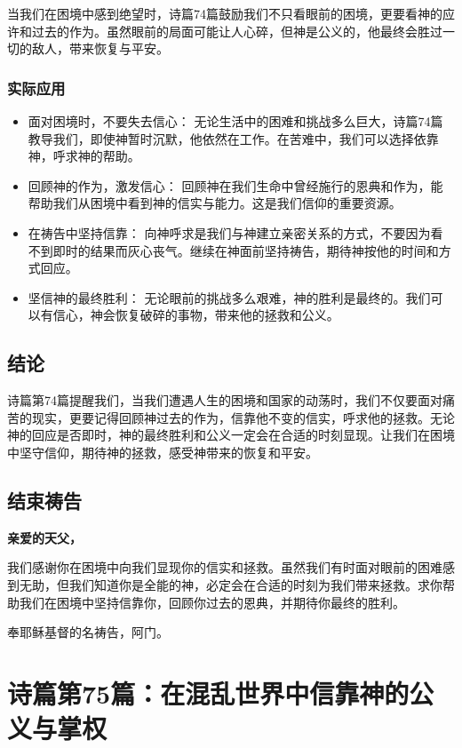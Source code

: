 \documentclass[a4paper, 12pt]{article}
\begin{document}
当我们在困境中感到绝望时，诗篇74篇鼓励我们不只看眼前的困境，更要看神的应许和过去的作为。虽然眼前的局面可能让人心碎，但神是公义的，他最终会胜过一切的敌人，带来恢复与平安。

\subsubsection*{实际应用}
\begin{itemize}
    \item 面对困境时，不要失去信心： 无论生活中的困难和挑战多么巨大，诗篇74篇教导我们，即使神暂时沉默，他依然在工作。在苦难中，我们可以选择依靠神，呼求神的帮助。

    \item 回顾神的作为，激发信心： 回顾神在我们生命中曾经施行的恩典和作为，能帮助我们从困境中看到神的信实与能力。这是我们信仰的重要资源。

    \item 在祷告中坚持信靠： 向神呼求是我们与神建立亲密关系的方式，不要因为看不到即时的结果而灰心丧气。继续在神面前坚持祷告，期待神按他的时间和方式回应。

    \item 坚信神的最终胜利： 无论眼前的挑战多么艰难，神的胜利是最终的。我们可以有信心，神会恢复破碎的事物，带来他的拯救和公义。

\end{itemize}

\subsection*{结论}
诗篇第74篇提醒我们，当我们遭遇人生的困境和国家的动荡时，我们不仅要面对痛苦的现实，更要记得回顾神过去的作为，信靠他不变的信实，呼求他的拯救。无论神的回应是否即时，神的最终胜利和公义一定会在合适的时刻显现。让我们在困境中坚守信仰，期待神的拯救，感受神带来的恢复和平安。
\subsection*{结束祷告}
\textbf{亲爱的天父，}

我们感谢你在困境中向我们显现你的信实和拯救。虽然我们有时面对眼前的困难感到无助，但我们知道你是全能的神，必定会在合适的时刻为我们带来拯救。求你帮助我们在困境中坚持信靠你，回顾你过去的恩典，并期待你最终的胜利。

奉耶稣基督的名祷告，阿门。
\newpage
\section{诗篇第75篇：在混乱世界中信靠神的公义与掌权}
\end{document}
